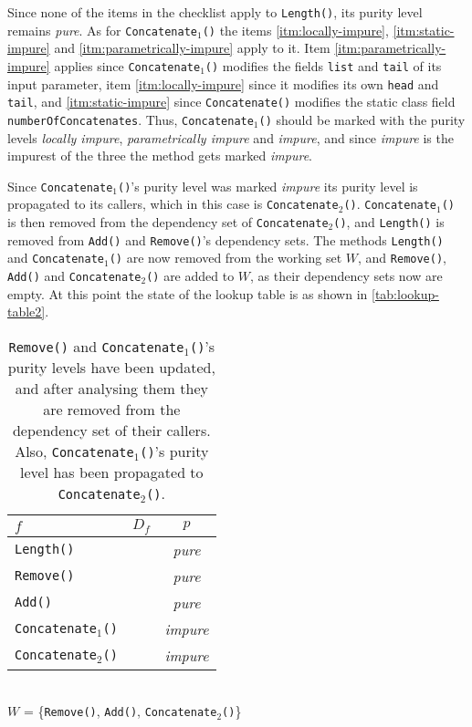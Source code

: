 \documentclass[a4paper,12pt]{article}
\begin{document}
Since none of the items in the checklist apply to \texttt{Length()}, its purity level remains \textit{pure}. As for \texttt{Concatenate$_1$()} the items \ref{itm:locally-impure}, \ref{itm:static-impure} and \ref{itm:parametrically-impure} apply to it. Item \ref{itm:parametrically-impure} applies since \texttt{Concatenate$_1$()} modifies the fields \texttt{list} and \texttt{tail} of its input parameter, item \autoref{itm:locally-impure} since it modifies its own \texttt{head} and \texttt{tail}, and \autoref{itm:static-impure} since \texttt{Concatenate()} modifies the static class field \texttt{numberOfConcatenates}. Thus, \texttt{Concatenate$_1$()} should be marked with the purity levels \textit{locally impure}, \textit{parametrically impure} and \textit{impure}, and since \textit{impure} is the impurest of the three the method gets marked \textit{impure}.

Since \texttt{Concatenate$_1$()}'s purity level was marked \textit{impure} its purity level is propagated to its callers, which in this case is \texttt{Concatenate$_2$()}. \texttt{Concatenate$_1$()} is then removed from the dependency set of \texttt{Concatenate$_2$()}, and \texttt{Length()} is removed from \texttt{Add()} and \texttt{Remove()}'s dependency sets. The methods \texttt{Length()} and \texttt{Concatenate$_1$()} are now removed from the working set $W$, and \texttt{Remove()}, \texttt{Add()} and \texttt{Concatenate$_2$()} are added to $W$, as their dependency sets now are empty. At this point the state of the lookup table is as shown in \autoref{tab:lookup-table2}.

\begin{table}[H]
  \caption{\texttt{Remove()} and \texttt{Concatenate$_1$()}'s purity levels have been updated, and after analysing them they are removed from the dependency set of their callers. Also, \texttt{Concatenate$_1$()}'s purity level has been propagated to \texttt{Concatenate$_2$()}.}
  \label{tab:lookup-table2}
  \centering
  \begin{tabular}{|l|c|c|}
    \hline
    $f$                        & $D_f$                  & $p$                            \\ \hline
    \texttt{Length()}          &                        & \textit{pure}                         \\
    \texttt{Remove()}          &                        & \textit{pure}                         \\
    \texttt{Add()}             &                        & \textit{pure}                         \\
    \texttt{Concatenate$_1$()}  &                        & \textit{impure}                       \\
    \texttt{Concatenate$_2$()}  &                        & \textit{impure}                       \\ \hline
  \end{tabular}
  \\
  $W$ = \{\texttt{Remove()}, \texttt{Add()}, \texttt{Concatenate$_2$()}\}
\end{table}
\end{document}
